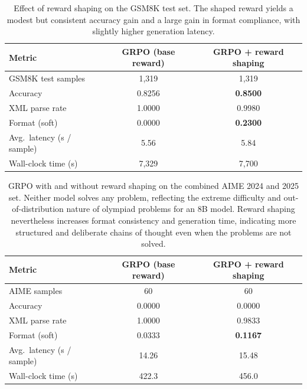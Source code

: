 \documentclass{article}
\begin{document}
\begin{table}[t]
\centering
\begin{tabular}{lcc}
\toprule
\textbf{Metric} & \textbf{GRPO (base reward)} & \textbf{GRPO + reward shaping} \\
\midrule
GSM8K test samples         & 1{,}319 & 1{,}319 \\
Accuracy                   & 0.8256 & \textbf{0.8500} \\
XML parse rate             & 1.0000 & 0.9980 \\
Format (soft)              & 0.0000 & \textbf{0.2300} \\
Avg.\ latency (s / sample) & 5.56   & 5.84   \\
Wall-clock time (s)        & 7{,}329 & 7{,}700 \\
\bottomrule
\end{tabular}
\medskip
\caption{Effect of reward shaping on the GSM8K test set. The shaped reward yields a modest but consistent accuracy gain and a large gain in format compliance, with slightly higher generation latency.}
\label{tab:gsm8k}
\end{table}

\begin{table}[t]
\centering
\begin{tabular}{lcc}
\toprule
\textbf{Metric} & \textbf{GRPO (base reward)} & \textbf{GRPO + reward shaping} \\
\midrule
AIME samples                & 60      & 60      \\
Accuracy                    & 0.0000  & 0.0000  \\
XML parse rate              & 1.0000  & 0.9833  \\
Format (soft)               & 0.0333  & \textbf{0.1167} \\
Avg.\ latency (s / sample)  & 14.26   & 15.48   \\
Wall-clock time (s)         & 422.3   & 456.0   \\
\bottomrule
\end{tabular}
\medskip
\caption{GRPO with and without reward shaping on the combined AIME 2024 and 2025 set. Neither model solves any problem, reflecting the extreme difficulty and out-of-distribution nature of olympiad problems for an 8B model. Reward shaping nevertheless increases format consistency and generation time, indicating more structured and deliberate chains of thought even when the problems are not solved.}
\label{tab:aime}
\end{table}
\end{document}
